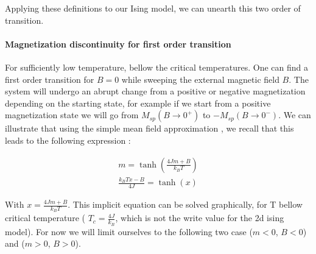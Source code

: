 \documentclass[ansiapaper]{report}
\begin{document}
\begin{multicols}{3}
Applying these definitions to our Ising model, we can unearth this two order of transition. 

\paragraph*{Magnetization discontinuity for first order transition}

For sufficiently low temperature, bellow the critical temperatures. One can find a first order transition for $B = 0$ while sweeping the external magnetic field $B$. The system will undergo an abrupt change from  a positive or negative magnetization depending on the starting state, for example if we start from a positive magnetization state we will go from $M_{sp}(B \to 0^+)$ to $-M_{sp}(B \to 0^-)$. We can illustrate that using the simple mean field approximation , we recall that this leads to the following expression : 

\begin{align}
    m = \tanh{\left( \frac{4Jm + B}{k_B T} \right)} \label{eq:magnetization-mean-field}\\
    \frac{k_BTx - B}{4J} = \tanh(x) \nonumber
\end{align}

With $ x = \frac{4Jm + B}{k_B T}$. This implicit equation can be solved graphically, for T bellow critical temperature ( $T_c = \frac{4J}{k_B}$, which is not the write value for the 2d ising model). For now we will limit ourselves to the following two case ($m< 0$, $B <0$) and ($m>0$, $B>0$).
\begin{figure}[H]


\end{figure}
\end{multicols}
\end{document}
